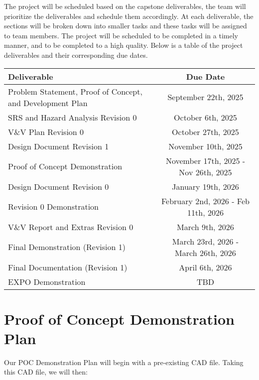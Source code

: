\documentclass{article}
\begin{document}
The project will be scheduled based on the capstone deliverables, the team will prioritize the deliverables and schedule them accordingly. At each deliverable, the sections will be broken down into smaller tasks and these tasks will be assigned to team members. The project will be scheduled to be completed in a timely manner, and to be completed to a high quality. Below is a table of the project deliverables and their corresponding due dates.

\begin{center}
  \begin{tabularx}{\textwidth}{Xc}
    \toprule
    \textbf{Deliverable} & \textbf{Due Date} \\
    \midrule
    Problem Statement, Proof of Concept, and Development Plan &
    September 22th, 2025 \\
    SRS and Hazard Analysis Revision 0 & October 6th, 2025 \\
    V\&V Plan Revision 0 & October 27th, 2025 \\
    Design Document Revision 1 & November 10th, 2025 \\
    Proof of Concept Demonstration & November 17th, 2025 - Nov 26th, 2025 \\
    Design Document Revision 0 & January 19th, 2026 \\
    Revision 0 Demonstration & February 2nd, 2026 - Feb 11th, 2026 \\
    V\&V Report and Extras Revision 0 & March 9th, 2026 \\
    Final Demonstration (Revision 1) & March 23rd, 2026 - March 26th, 2026 \\
    Final Documentation (Revision 1) & April 6th, 2026 \\
    EXPO Demonstration & TBD \\
    \bottomrule
  \end{tabularx}
\end{center}




\section{Proof of Concept Demonstration Plan}

\iffalse
What is the main risk, or risks, for the success of your project?  What will you
demonstrate during your proof of concept demonstration to convince yourself that
you will be able to overcome this risk?
\fi

Our POC Demonstration Plan will begin with a pre-existing CAD file. Taking this 
CAD file, we will then:
\end{document}
